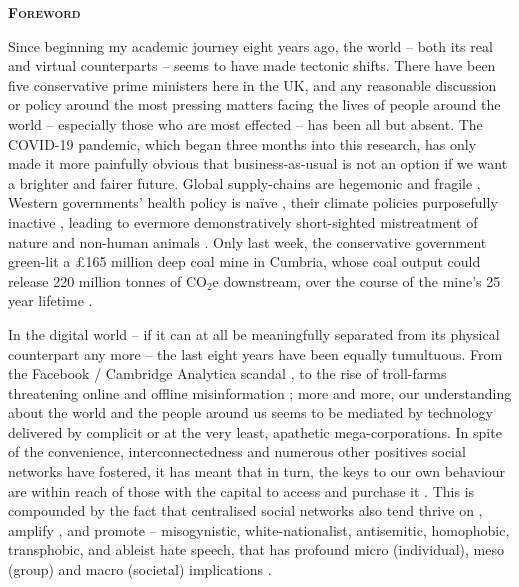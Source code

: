 \newpage
{}
{}
\begin{flushleft}
	\Huge \textsc{\textbf{Foreword}}
	
\end{flushleft}

\noindent Since beginning my academic journey eight years ago, the world -- both its real and virtual counterparts -- seems to have made tectonic shifts. There have been five conservative prime ministers here in the UK, and any reasonable discussion or policy around the most pressing matters facing the lives of people around the world -- especially those who are most effected -- has been all but absent. The COVID-19 pandemic, which began three months into this research, has only made it more painfully obvious that business-as-usual is not an option if we want a brighter and fairer future. Global supply-chains are hegemonic and fragile \citep{gomez2020}, Western governments' health policy is naïve \citep{navarro2021}, their climate policies purposefully inactive \citep{slawinski2017}, leading to evermore demonstratively short-sighted mistreatment of nature and non-human animals  \citep{monbiot2022}. Only last week, the conservative government green-lit a \pounds165 million deep coal mine in Cumbria, whose coal output could release 220 million tonnes of CO$_2$e downstream, over the course of the mine's 25 year lifetime \citep[Grubb and Barrett in][p. 252]{grubb2022}.

In the digital world -- if it can at all be meaningfully separated from its physical counterpart any more -- the last eight years have been equally tumultuous. From the Facebook / Cambridge Analytica scandal \citep{isaak2018}, to the rise of troll-farms threatening online and offline misinformation \citep{badawy2018}; more and more, our understanding about the world and the people around us seems to be mediated by technology delivered by complicit or at the very least, apathetic mega-corporations. In spite of the convenience, interconnectedness and numerous other positives social networks have fostered, it has meant that in turn, the keys to our own behaviour are within reach of those with the capital to access and purchase it \citep{zuboff2019}. This is compounded by the fact that centralised social networks also tend thrive on \citep{thorleifsson2022}, amplify \citep{mathew2019}, and promote \citep{ccdh2022,adl2022}  -- misogynistic, white-nationalist, antisemitic, homophobic, transphobic, and ableist hate speech, that has profound micro (individual), meso (group) and macro (societal) implications \citep{alkiviadou2019}. 


